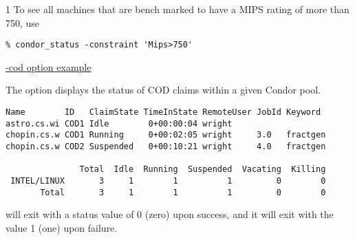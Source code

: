 \begin{ManPage}{\label{man-condor-status}}{1}
To see all machines that are bench marked to have a MIPS rating
of more than 750, use
\begin{verbatim}
% condor_status -constraint 'Mips>750' 
\end{verbatim}

\underline{-cod option example}

The  option displays the status of COD
claims within a given Condor pool. 

\footnotesize
\begin{verbatim}
Name        ID   ClaimState TimeInState RemoteUser JobId Keyword
astro.cs.wi COD1 Idle        0+00:00:04 wright
chopin.cs.w COD1 Running     0+00:02:05 wright     3.0   fractgen
chopin.cs.w COD2 Suspended   0+00:10:21 wright     4.0   fractgen

               Total  Idle  Running  Suspended  Vacating  Killing
 INTEL/LINUX       3     1        1          1         0        0
       Total       3     1        1          1         0        0
\end{verbatim}
\normalsize


\ExitStatus

 will exit with a status value of 0 (zero) upon success,
and it will exit with the value 1 (one) upon failure.

\end{ManPage}

